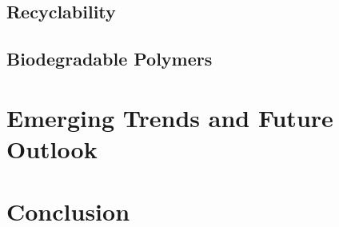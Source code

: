 \documentclass[11pt,a4paper]{article}
\begin{document}
\subsection{Recyclability}

\subsection{Biodegradable Polymers}

\section{Emerging Trends and Future Outlook}

\section{Conclusion}
\end{document}
